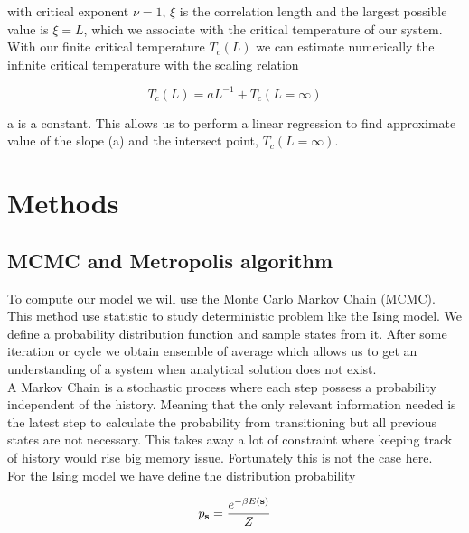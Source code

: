 \documentclass[english,notitlepage,reprint,nofootinbib]{revtex4-2}  %
\begin{document}
	with critical exponent $\nu=1$, $\xi$ is the correlation length and the largest possible 
	value is $\xi=L$, which we associate with the critical temperature of our system. \\
	
	With our finite critical temperature $T_c(L)$  we can estimate numerically the infinite
	critical temperature with the scaling relation 
	
	\begin{equation}
		T_c(L) = aL^{-1} + T_c(L=\infty) \label{eq:scaling relation}
	\end{equation}
	
	a is a constant. This allows us to perform a linear regression to find approximate value 
	of the slope (a) and the intersect point, $T_c(L=\infty)$.
	
	
	
	\section{Methods}\label{sec:methods}
	\subsection{MCMC and Metropolis algorithm} \label{subsec:mcmc}
	To compute our model we will use the Monte Carlo Markov Chain (MCMC). This method use 
	statistic to study deterministic problem like the Ising model. We define a probability 
	distribution function and sample states from it. After some iteration or cycle we obtain
	ensemble of average which allows us to get an understanding of a system when analytical 
	solution does not exist. \\
	
	A Markov Chain is a stochastic process where each step possess a probability
	independent of the history. Meaning that the only relevant information needed is the 
	latest step to calculate the probability from transitioning but all previous states are
	not necessary. This takes away a lot of constraint where keeping track of history would
	rise big memory issue. Fortunately this is not the case here. \\
	
	For the Ising model we have define the distribution probability
	
	\begin{equation}
		p_{\rm \textbf{s}} = \frac{e^{-\beta E(\textbf{s})}}{Z} \label{eq:prob distribution}
	\end{equation}	 
	
\end{document}

